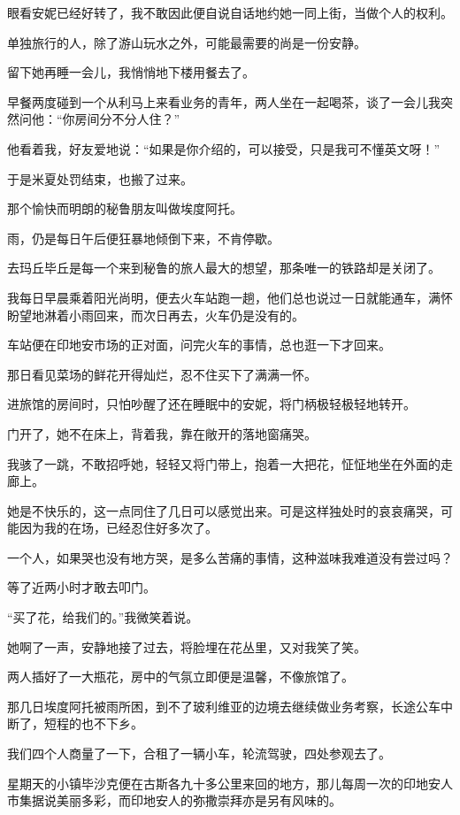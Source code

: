\par 眼看安妮已经好转了，我不敢因此便自说自话地约她一同上街，当做个人的权利。
\par 单独旅行的人，除了游山玩水之外，可能最需要的尚是一份安静。
\par 留下她再睡一会儿，我悄悄地下楼用餐去了。
\par 早餐两度碰到一个从利马上来看业务的青年，两人坐在一起喝茶，谈了一会儿我突然问他：“你房间分不分人住？”
\par 他看着我，好友爱地说：“如果是你介绍的，可以接受，只是我可不懂英文呀！”
\par 于是米夏处罚结束，也搬了过来。
\par 那个愉快而明朗的秘鲁朋友叫做埃度阿托。
\par 雨，仍是每日午后便狂暴地倾倒下来，不肯停歇。
\par 去玛丘毕丘是每一个来到秘鲁的旅人最大的想望，那条唯一的铁路却是关闭了。
\par 我每日早晨乘着阳光尚明，便去火车站跑一趟，他们总也说过一日就能通车，满怀盼望地淋着小雨回来，而次日再去，火车仍是没有的。
\par 车站便在印地安市场的正对面，问完火车的事情，总也逛一下才回来。
\par 那日看见菜场的鲜花开得灿烂，忍不住买下了满满一怀。
\par 进旅馆的房间时，只怕吵醒了还在睡眠中的安妮，将门柄极轻极轻地转开。
\par 门开了，她不在床上，背着我，靠在敞开的落地窗痛哭。
\par 我骇了一跳，不敢招呼她，轻轻又将门带上，抱着一大把花，怔怔地坐在外面的走廊上。
\par 她是不快乐的，这一点同住了几日可以感觉出来。可是这样独处时的哀哀痛哭，可能因为我的在场，已经忍住好多次了。
\par 一个人，如果哭也没有地方哭，是多么苦痛的事情，这种滋味我难道没有尝过吗？
\par 等了近两小时才敢去叩门。
\par “买了花，给我们的。”我微笑着说。
\par 她啊了一声，安静地接了过去，将脸埋在花丛里，又对我笑了笑。
\par 两人插好了一大瓶花，房中的气氛立即便是温馨，不像旅馆了。
\par 那几日埃度阿托被雨所困，到不了玻利维亚的边境去继续做业务考察，长途公车中断了，短程的也不下乡。
\par 我们四个人商量了一下，合租了一辆小车，轮流驾驶，四处参观去了。
\par 星期天的小镇毕沙克便在古斯各九十多公里来回的地方，那儿每周一次的印地安人市集据说美丽多彩，而印地安人的弥撒崇拜亦是另有风味的。
